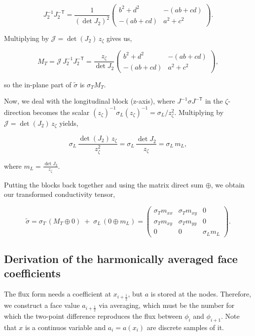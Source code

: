 \documentclass[final-report]{report-template}
\begin{document}
$$
J_2^{-1}J_2^{-\mathsf T}=\frac{1}{(\det J_2)^2}\begin{pmatrix} b^2+d^2 & -(ab+cd)\\ -(ab+cd) & a^2+c^2\end{pmatrix}.
$$

Multiplying by $\mathcal J=\det(J_2)\,z_\zeta$ gives us,

$$
M_T=\mathcal J\,J_2^{-1}J_2^{-\mathsf T}
=\frac{z_\zeta}{\det J_2}
\begin{pmatrix} b^2+d^2 & -(ab+cd)\\ -(ab+cd) & a^2+c^2 \end{pmatrix},
$$

so the in-plane part of $\tilde\sigma$ is $\sigma_T M_T$.

Now, we deal with the longitudinal block (z-axis), where $J^{-1}\sigma J^{-\mathsf T}$ in the $\zeta$-direction becomes the scalar $(z_\zeta)^{-1}\sigma_L(z_\zeta)^{-1}=\sigma_L/z_\zeta^{2}$. Multiplying by $\mathcal J=\det(J_2)\,z_\zeta$ yields,

$$
\sigma_L\,\frac{\det(J_2)\,z_\zeta}{z_\zeta^{2}}=\sigma_L\,\frac{\det J_2}{z_\zeta}=\sigma_L\,m_L,
$$

where $m_L=\frac{\det J_2}{z_\zeta}$.

Putting the blocks back together and using the matrix direct sum $\oplus$, we obtain our transformed conductivity tensor,

$$
\tilde\sigma=\sigma_T\,(M_T\oplus 0)\;+\;\sigma_L\,(0\oplus m_L)
=\begin{pmatrix}\sigma_T m_{xx}&\sigma_T m_{xy}&0\\ \sigma_T m_{xy}&\sigma_T m_{yy}&0\\ 0&0&\sigma_L m_L\end{pmatrix}.
$$


\subsection{Derivation of the harmonically averaged face coefficients}
\label{sec:averaging-face-coefficients}

The flux form needs a coefficient at $x_{i+\frac12}$, but $a$ is stored at the
nodes. Therefore, we construct a face value $a_{i+\frac12}$ via averaging, which must be the number for which the two-point difference reproduces the flux between $\phi_i$ and $\phi_{i+1}$. Note that $x$ is a continuos variable and $a_i = a(x_i)$ are discrete samples of it.
\end{document}

